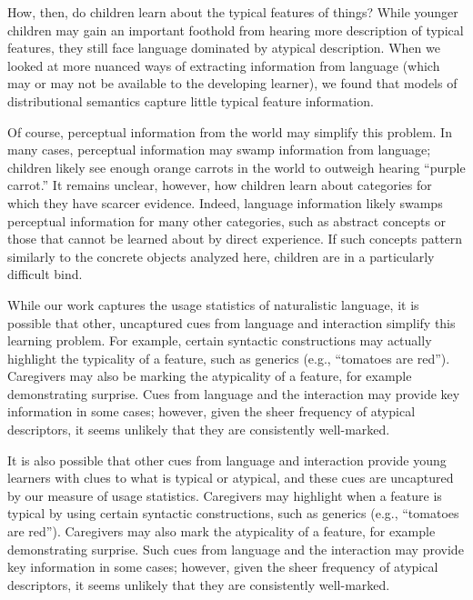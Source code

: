 \documentclass[10pt, letterpaper]{article}
\begin{document}
How, then, do children learn about the typical features of things? While
younger children may gain an important foothold from hearing more
description of typical features, they still face language dominated by
atypical description. When we looked at more nuanced ways of extracting
information from language (which may or may not be available to the
developing learner), we found that models of distributional semantics
capture little typical feature information.

Of course, perceptual information from the world may simplify this
problem. In many cases, perceptual information may swamp information
from language; children likely see enough orange carrots in the world to
outweigh hearing ``purple carrot.'' It remains unclear, however, how
children learn about categories for which they have scarcer evidence.
Indeed, language information likely swamps perceptual information for
many other categories, such as abstract concepts or those that cannot be
learned about by direct experience. If such concepts pattern similarly
to the concrete objects analyzed here, children are in a particularly
difficult bind.

While our work captures the usage statistics of naturalistic language,
it is possible that other, uncaptured cues from language and interaction
simplify this learning problem. For example, certain syntactic
constructions may actually highlight the typicality of a feature, such
as generics (e.g., ``tomatoes are red''). Caregivers may also be marking
the atypicality of a feature, for example demonstrating surprise. Cues
from language and the interaction may provide key information in some
cases; however, given the sheer frequency of atypical descriptors, it
seems unlikely that they are consistently well-marked.

It is also possible that other cues from language and interaction
provide young learners with clues to what is typical or atypical, and
these cues are uncaptured by our measure of usage statistics. Caregivers
may highlight when a feature is typical by using certain syntactic
constructions, such as generics (e.g., ``tomatoes are red''). Caregivers
may also mark the atypicality of a feature, for example demonstrating
surprise. Such cues from language and the interaction may provide key
information in some cases; however, given the sheer frequency of
atypical descriptors, it seems unlikely that they are consistently
well-marked.
\end{document}
